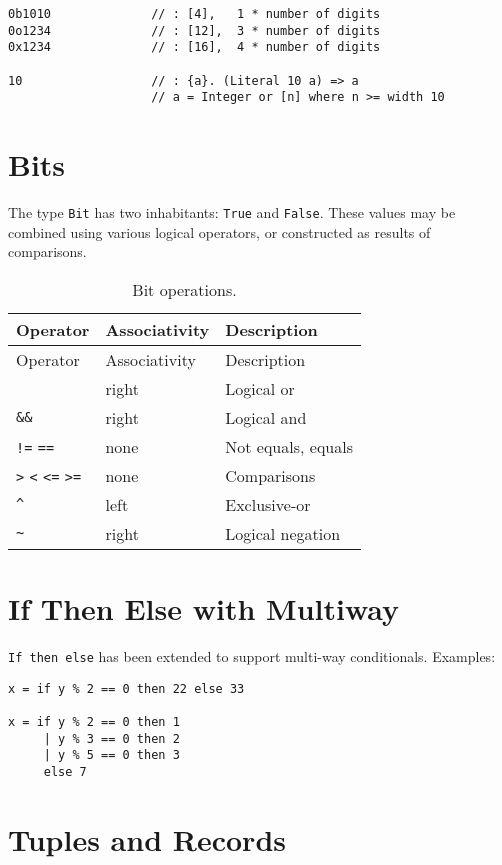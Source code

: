 \begin{verbatim}
0b1010              // : [4],   1 * number of digits
0o1234              // : [12],  3 * number of digits
0x1234              // : [16],  4 * number of digits

10                  // : {a}. (Literal 10 a) => a
                    // a = Integer or [n] where n >= width 10
\end{verbatim}

\section{Bits}\label{bits}

The type \texttt{Bit} has two inhabitants: \texttt{True} and
\texttt{False}. These values may be combined using various logical
operators, or constructed as results of comparisons.

\begin{longtable}[c]{@{}lll@{}}
\caption{Bit operations.}\tabularnewline
\toprule
Operator & Associativity & Description\tabularnewline
\midrule
\endfirsthead
\toprule
Operator & Associativity & Description\tabularnewline
\midrule
\endhead
\texttt{\textbar{}\textbar{}} & right & Logical or\tabularnewline
\texttt{\&\&} & right & Logical and\tabularnewline
\texttt{!=} \texttt{==} & none & Not equals, equals\tabularnewline
\texttt{\textgreater{}} \texttt{\textless{}} \texttt{\textless{}=}
\texttt{\textgreater{}=} & none & Comparisons\tabularnewline
\texttt{\^{}} & left & Exclusive-or\tabularnewline
\texttt{\textasciitilde{}} & right & Logical negation\tabularnewline
\bottomrule
\end{longtable}

\section{If Then Else with Multiway}\label{if-then-else-with-multiway}

\texttt{If\ then\ else} has been extended to support multi-way
conditionals. Examples:

\begin{verbatim}
x = if y % 2 == 0 then 22 else 33

x = if y % 2 == 0 then 1
     | y % 3 == 0 then 2
     | y % 5 == 0 then 3
     else 7
\end{verbatim}

\section{Tuples and Records}\label{tuples-and-records}

